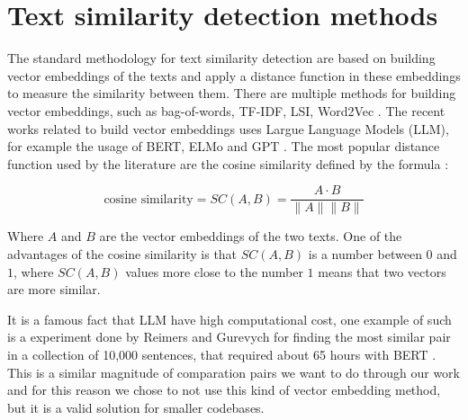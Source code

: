 \en

\section{Text similarity detection methods}

The standard methodology for text similarity detection are based on building vector embeddings of
the texts and apply a distance function in these embeddings to measure the similarity between them. 
There are multiple methods for building vector embeddings, such as bag-of-words, TF-IDF, LSI, Word2Vec \citep{gensimlivro}. 
The recent works related to build vector embeddings uses Largue Language Models (LLM), for example the usage of BERT, ELMo 
and GPT \citep{llmsimilar}. The most popular distance function used by the literature are the cosine similarity 
defined by the formula \citep{cosineref}:

$$\text{cosine similarity} = SC(A,B) = \frac{ A \cdot B}{ \lVert A \rVert \lVert B \rVert }$$


Where $A$ and $B$ are the vector embeddings of the two texts. One of the advantages of the cosine similarity is that $SC(A,B)$ 
is a number between $0$ and $1$, where $SC(A,B)$ values more close to the number $1$ means that two vectors are more similar. 

It is a famous fact that LLM have high computational cost, one example of such is a experiment done by Reimers and Gurevych for 
finding the most similar pair in a collection of 10,000 sentences, that required about 65 hours with BERT \citep{bertsimilar}. This 
is a similar magnitude of comparation pairs we want to do through our work and for this reason we chose to not use this kind of 
vector embedding method, but it is a valid solution for smaller codebases.
